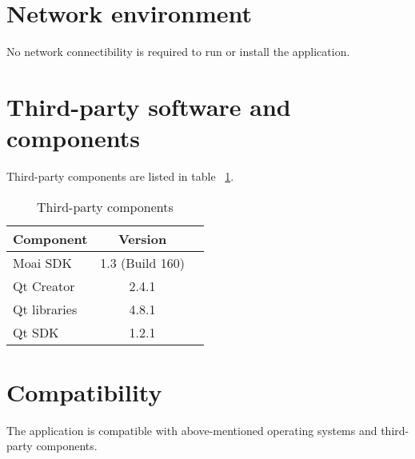\section{Network environment}

No network connectibility is required to run or install the application.

\section{Third-party software and components}

Third-party components are listed in table ~\ref{component_table}.

\begin{table}[h!]
\begin{center}
\caption{Third-party components}
\label{component_table}
	\begin{tabular}{|l|c|c|}
	\hline
	Component & Version\\ 
	\hline \hline

	Moai SDK & 1.3 (Build 160)\\
	\hline
	Qt Creator & 2.4.1\\
	\hline
	Qt libraries & 4.8.1\\
	\hline
	Qt SDK & 1.2.1\\
	\hline
	\end{tabular}
\end{center}
\end{table}
\section{Compatibility}

The application is compatible with above-mentioned operating systems and third-party components.
